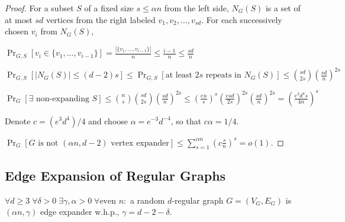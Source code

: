 \begin{proof}
    For a subset $S$ of a fixed size $s\leq\alpha n$ from the left side,
    $N_G(S)$ is a set of at most $sd$ vertices from the right labeled $v_1,v_2,\ldots,v_{sd}$.
    For each successively chosen $v_i$ from $N_G(S)$,
    
    $\Pr_{G,S}[v_i\in\{v_1,\ldots,v_{i-1}\}]=\frac{|\{v_1,\ldots,v_{i-1}\}|}{n}
    \leq\frac{i-1}{n}\leq\frac{sd}{n}$
    
    $\Pr_{G,S}[|N_G(S)|\leq(d-2)s]\leq \Pr_{G,S}[\text{at least }2s\text{ repeats in }N_G(S)]
    \leq\binom{sd}{2s}\left(\frac{sd}{n}\right)^{2s}$
    
    $\Pr_G[\exists\text{ non-expanding }S]\leq\binom{n}{s}\binom{sd}{2s}\left(\frac{sd}{n}\right)^{2s}
    \leq\left(\frac{en}{s}\right)^s\left(\frac{esd}{2s}\right)^{2s}\left(\frac{sd}{n}\right)^{2s}
    =\left(\frac{e^3d^4s}{4n}\right)^s$
    
    Denote $c=(e^3d^4)/4$ and choose $\alpha=e^{-3}d^{-4}$, so that $c\alpha=1/4$.
    
    $\Pr_G[G\text{ is not }(\alpha n,d-2)\text{ vertex expander}]
    \leq\sum_{s=1}^{\alpha n}\left(c\frac{s}{n}\right)^{s}=o(1)$.
\end{proof}

\subsection{Edge Expansion of Regular Graphs}
\label{subsec:edge-expansion-reg}

\begin{theorem}
    \label{thm:reg-edge-expansion-optimal-gamma}
    $\forall d\geq3\;\forall\delta>0\;\exists\gamma,\alpha>0\;\forall\text{even }n:$
    a random $d$-regular graph $G=(V_G,E_G)$ is $(\alpha n,\gamma)$ edge expander w.h.p.,
    $\gamma=d-2-\delta$.
\end{theorem}

